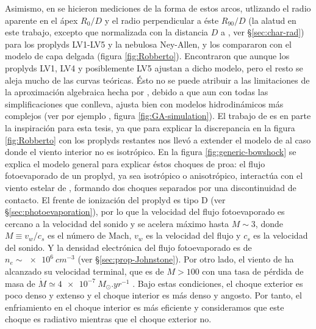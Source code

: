Asimismo, en \citet{Robberto:2005} se hicieron mediciones de la forma de estos arcos, utlizando el radio aparente en el ápex $R_0/D$ y el radio perpendicular a éste $R_{90}/D$ (la alatud en este trabajo, excepto que normalizada con la distancia $D$ a \thC{}, ver \S \ref{sec:char-rad}) para los proplyds LV1-LV5 y la nebulosa Ney-Allen, y los compararon con el modelo de capa delgada \citep{Canto:1996} (figura \ref{fig:Robberto}). Encontraron que aunque los proplyds LV1, LV4 y posiblemente LV5 ajustan a dicho modelo, pero el resto se aleja mucho de las curvas teóricas. Ésto no se puede atribuir a las limitaciones de la aproximación algebraica hecha por \citet{Canto:1996}, debido a que aun con todas las simplificaciones que conlleva, ajusta bien con modelos hidrodinámicos más complejos (ver por ejemplo \citet{Garcia-Arredondo:2001}, figura \ref{fig:GA-simulation}). El trabajo de \citet{Robberto:2005} es en parte la inspiración para esta tesis, ya que para explicar la discrepancia en la figura \ref{fig:Robberto} con los proplyds restantes nos llevó a extender el modelo de \citet{Canto:1996} al caso donde el viento interior no es isotrópico. En la figura \ref{fig:generic-bowshock} se explica el modelo general para explicar éstos choques de proa: el flujo fotoevaporado de un proplyd, ya sea isotrópico o anisotrópico, interactúa con el viento estelar de \thC{}, formando dos choques separados por una discontinuidad de contacto. El frente de ionización del proplyd es tipo D (ver \S \ref{sec:photoevaporation}), por lo que la velocidad del flujo fotoevaporado es cercano a la velocidad del sonido y se acelera máximo hasta $M\sim 3$, donde $M\equiv v_w/c_s$ es el número de Mach, $v_w$ es la velocidad del flujo y $c_s$ es la velocidad del sonido. Y la densidad electrónica del flujo fotoevaporado es de $n_e\sim \SI{e6}{cm^{-3}}$ (ver \S \ref{sec:prop-Johnstone}). Por otro lado, el viento de \thC{} ha alcanzado su velocidad terminal, que es de $M > 100$ con una tasa de pérdida de masa de $\dot{M} \simeq \SI{4e-7}{M_\odot.yr^{-1}}$ \citep{Gagne:2005}. Bajo estas condiciones, el choque exterior es poco denso y extenso y el choque interior es más denso y angosto. Por tanto, el enfriamiento en el choque interior es más eficiente y consideramos que este choque es radiativo mientras que el choque exterior no.

